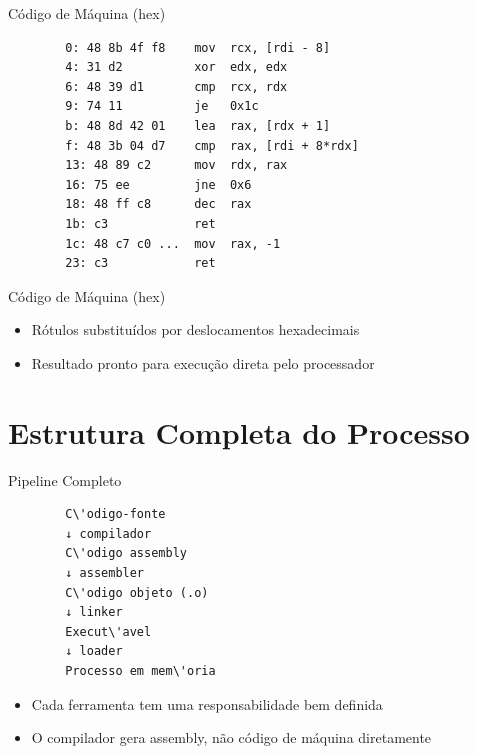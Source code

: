 \begin{frame}[fragile]{Código de Máquina (hex)}

    \begin{lstlisting}
        0: 48 8b 4f f8    mov  rcx, [rdi - 8]
        4: 31 d2          xor  edx, edx
        6: 48 39 d1       cmp  rcx, rdx
        9: 74 11          je   0x1c
        b: 48 8d 42 01    lea  rax, [rdx + 1]
        f: 48 3b 04 d7    cmp  rax, [rdi + 8*rdx]
        13: 48 89 c2      mov  rdx, rax
        16: 75 ee         jne  0x6
        18: 48 ff c8      dec  rax
        1b: c3            ret
        1c: 48 c7 c0 ...  mov  rax, -1
        23: c3            ret
    \end{lstlisting}
\end{frame}

\begin{frame}{Código de Máquina (hex)}

    \begin{itemize}

        \item
        Rótulos substituídos por deslocamentos hexadecimais
        \item
        Resultado pronto para execução direta pelo processador
    \end{itemize}
\end{frame}


\section{Estrutura Completa do
Processo}\label{estrutura-completa-do-processo}

\begin{frame}[fragile]{Pipeline Completo}

    \begin{lstlisting}
        C\'odigo-fonte
        ↓ compilador
        C\'odigo assembly
        ↓ assembler
        C\'odigo objeto (.o)
        ↓ linker
        Execut\'avel
        ↓ loader
        Processo em mem\'oria
    \end{lstlisting}

    \begin{itemize}

        \item
        Cada ferramenta tem uma responsabilidade bem definida
        \item
        O compilador gera assembly, não código de máquina diretamente
    \end{itemize}
\end{frame}


